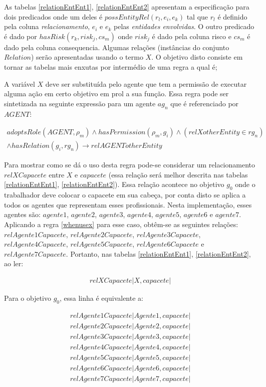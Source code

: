 As tabelas \ref{relationEntEnt1}, \ref{relationEntEnt2} apresentam a especificação para dois predicados onde um deles é $possEntityRel(r_l,e_i,e_k)$ tal que $r_l$ é definido pela coluna \textit{relacionamento}, $e_i$ e $e_k$ pelas \textit{entidades envolvidas}. 
O outro predicado é dado por $hasRisk(r_k,risk_j,cs_m)$ onde $risk_j$ é dado pela coluna risco e $cs_m$ é dado pela coluna consequencia. 
Algumas relações (instâncias do conjunto $Relation$) serão apresentadas usando o termo $X$. O objetivo disto consiste em tornar as tabelas mais enxutas por intermédio de uma regra a qual é; 

A variável $X$ deve ser substituída pelo agente que tem a permissão de executar alguma ação em certo objetivo em prol a sua função. 
Essa regra pode ser sintetizada na seguinte expressão para um agente $ag_n$ que é referenciado por $AGENT$:

\begin{eqnarray}\label{whenusex} \nonumber
    adoptsRole(AGENT,\rho_m) \wedge hasPermission(\rho_m,g_i) \wedge (relXotherEntity \in rg_n)  \\ 
    \wedge hasRelation(g_i,rg_n) \to relAGENTotherEntity 
\end{eqnarray}


Para mostrar como se dá o uso desta regra pode-se considerar um relacionamento $ relXCapacete$ entre $X$ e $capacete$ (essa relação será melhor descrita nas tabelas \ref{relationEntEnt1}, \ref{relationEntEnt2}). Essa relação acontece no objetivo $g_0$ onde o trabalhador deve colocar o capacete em sua cabeça, por conta disto se aplica a todos os agentes que representam esses profissionais. Nesta implementação, esses agentes são: $agente1$, $agente2$, $agente3$, $agente4$, $agente5$, $agente6$ e $agente7$. Aplicando a regra \ref{whenusex} para esse caso, obtêm-se as seguintes relações: $relAgente1Capacete$, $relAgente2Capacete$, $relAgente3Capacete$, $relAgente4Capacete$, $relAgente5Capacete$, $relAgente6Capacete$ e $relAgente7Capacete$. Portanto, nas tabelas \ref{relationEntEnt1}, \ref{relationEntEnt2}, ao ler:  

\begin{eqnarray}
	relXCapacete | X,capacete |
\end{eqnarray}

Para o objetivo $g_0$, essa linha é equivalente a: 

\begin{eqnarray}
relAgente1Capacete | Agente1 ,capacete | \nonumber \\
relAgente2Capacete | Agente2 ,capacete | \nonumber \\ 
relAgente3Capacete | Agente3 ,capacete | \nonumber \\ 
relAgente4Capacete | Agente4 ,capacete | \nonumber \\
relAgente5Capacete | Agente5 ,capacete | \nonumber \\
relAgente6Capacete | Agente6 ,capacete | \nonumber \\
relAgente7Capacete | Agente7 ,capacete | \nonumber \\
\nonumber \\
\end{eqnarray}

